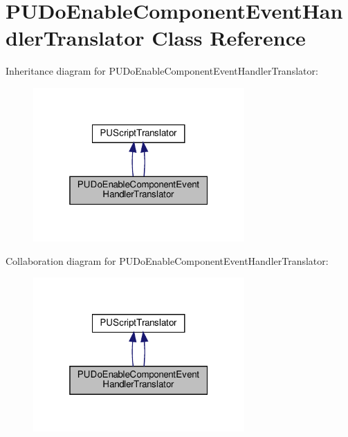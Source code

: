 \hypertarget{classPUDoEnableComponentEventHandlerTranslator}{}\section{P\+U\+Do\+Enable\+Component\+Event\+Handler\+Translator Class Reference}
\label{classPUDoEnableComponentEventHandlerTranslator}


Inheritance diagram for P\+U\+Do\+Enable\+Component\+Event\+Handler\+Translator\+:
\nopagebreak
\begin{figure}[H]
\begin{center}
\leavevmode
\includegraphics[width=229pt]{classPUDoEnableComponentEventHandlerTranslator__inherit__graph}
\end{center}
\end{figure}


Collaboration diagram for P\+U\+Do\+Enable\+Component\+Event\+Handler\+Translator\+:
\nopagebreak
\begin{figure}[H]
\begin{center}
\leavevmode
\includegraphics[width=229pt]{classPUDoEnableComponentEventHandlerTranslator__coll__graph}
\end{center}
\end{figure}
